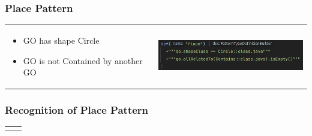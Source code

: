 





\begin{frame}[fragile]
  \frametitle{Place Pattern}


  \hspace*{-1.5cm}
  \begin{tabular}{m{7cm}  m{5cm}}
    \begin{itemize}
      \setlength\itemsep{.6cm}
      \item GO has shape Circle
      \item GO is not Contained by another GO
    \end{itemize}
     &
    \vspace{-.5cm}
    \includegraphics[width=7cm]{images/place-pattern}
  \end{tabular}
\end{frame}

\begin{frame}
  \frametitle{Recognition of Place Pattern}
  \hspace*{-1.5cm}
  \begin{tabular}{m{10cm}  m{5cm}}
    
     &
    \vspace{2.5cm}
    
  \end{tabular}
\end{frame}


